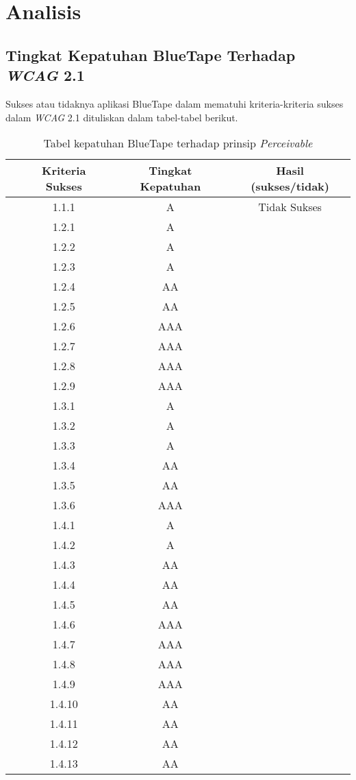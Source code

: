 \chapter{Analisis}
\label{chap:analisis}

\section{Tingkat Kepatuhan BlueTape Terhadap \textit{WCAG} 2.1}
Sukses atau tidaknya aplikasi BlueTape dalam mematuhi kriteria-kriteria sukses dalam \textit{WCAG} 2.1 dituliskan dalam tabel-tabel berikut.
\label{sec:kepatuhan_bluetape_terhadap_wcag_2.1}
\begin{table}[H]
    \centering 
    \caption{Tabel kepatuhan BlueTape terhadap prinsip \textit{Perceivable}}
    \label{tab:kepatuhan_bluetape_perceivable}
    \begin{tabular}{cccc}
        \toprule
        & Kriteria Sukses & Tingkat Kepatuhan & Hasil (sukses/tidak)\\

        \midrule
        & 1.1.1 & A & Tidak Sukses \\
        & 1.2.1 & A & \\
        & 1.2.2 & A & \\
        & 1.2.3 & A & \\
        & 1.2.4 & AA & \\
        & 1.2.5 & AA & \\
        & 1.2.6 & AAA & \\
        & 1.2.7 & AAA & \\
        & 1.2.8 & AAA & \\
        & 1.2.9 & AAA & \\
        & 1.3.1 & A & \\
        & 1.3.2 & A & \\
        & 1.3.3 & A & \\
        & 1.3.4 & AA & \\
        & 1.3.5 & AA & \\
        & 1.3.6 & AAA & \\
        & 1.4.1 & A & \\
        & 1.4.2 & A & \\
        & 1.4.3 & AA & \\
        & 1.4.4 & AA & \\
        & 1.4.5 & AA & \\
        & 1.4.6 & AAA & \\
        & 1.4.7 & AAA & \\
        & 1.4.8 & AAA & \\
        & 1.4.9 & AAA & \\
        & 1.4.10 & AA & \\
        & 1.4.11 & AA & \\
        & 1.4.12 & AA & \\
        & 1.4.13 & AA & \\
        
        \bottomrule

    \end{tabular}
\end{table}
